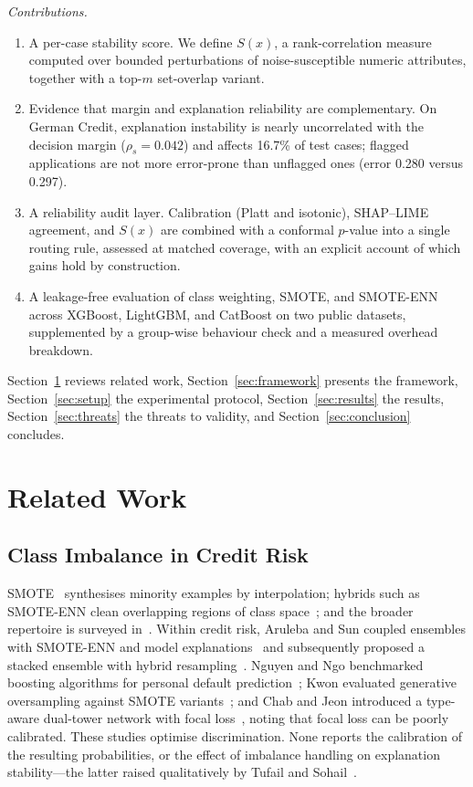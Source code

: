 \documentclass[journal]{IEEEtran}
\begin{document}
\emph{Contributions.}
\begin{enumerate}
\item A per-case stability score. We define $S(x)$, a rank-correlation measure
computed over bounded perturbations of noise-susceptible numeric attributes,
together with a top-$m$ set-overlap variant.
\item Evidence that margin and explanation reliability are complementary. On
German Credit, explanation instability is nearly uncorrelated with the
decision margin ($\rho_s=0.042$) and affects 16.7\% of test cases; flagged
applications are not more error-prone than unflagged ones (error 0.280 versus
0.297).
\item A reliability audit layer. Calibration (Platt and isotonic), SHAP--LIME
agreement, and $S(x)$ are combined with a conformal $p$-value into a single
routing rule, assessed at matched coverage, with an explicit account of which
gains hold by construction.
\item A leakage-free evaluation of class weighting, SMOTE, and SMOTE-ENN across
XGBoost, LightGBM, and CatBoost on two public datasets, supplemented by a
group-wise behaviour check and a measured overhead breakdown.
\end{enumerate}
Section~\ref{sec:related} reviews related work, Section~\ref{sec:framework}
presents the framework, Section~\ref{sec:setup} the experimental protocol,
Section~\ref{sec:results} the results, Section~\ref{sec:threats} the threats to
validity, and Section~\ref{sec:conclusion} concludes.

\section{Related Work}
\label{sec:related}

\subsection{Class Imbalance in Credit Risk}
SMOTE~\cite{chawla2002smote} synthesises minority examples by interpolation;
hybrids such as SMOTE-ENN clean overlapping regions of class space~\cite{batista2004study};
and the broader repertoire is surveyed in~\cite{he2009learning}. Within credit
risk, Aruleba and Sun coupled ensembles with SMOTE-ENN and model
explanations~\cite{aruleba2024credit} and subsequently proposed a stacked
ensemble with hybrid resampling~\cite{aruleba2025improved}. Nguyen and Ngo
benchmarked boosting algorithms for personal default prediction~\cite{nguyen2025comparative};
Kwon evaluated generative oversampling against SMOTE variants~\cite{kwon2026generative};
and Chab and Jeon introduced a type-aware dual-tower network with focal
loss~\cite{chab2026csanet}, noting that focal loss can be poorly calibrated.
These studies optimise discrimination. None reports the calibration of the
resulting probabilities, or the effect of imbalance handling on explanation
stability---the latter raised qualitatively by Tufail and Sohail~\cite{tufail2026signal}.
\end{document}
